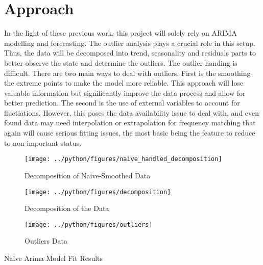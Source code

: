\documentclass[11pt, a4paper, leqno]{article}
\begin{document}
\section{Approach} %
\label{sec:appro}

In the light of these previous work, this project will solely rely on ARIMA modelling and forecasting.
The outlier analysis plays a crucial role in this setup. Thus, the data will be decomposed into trend, seasonality and residuals parts to better observe the state and determine the outliers.
The outlier handing is difficult. There are two main ways to deal with outliers. First is the smoothing the extreme points to make the model more reliable. This approach will lose valuable information but significantly improve the data process and allow for better prediction. The second is the use of external variables to account for fluctiations. However, this poses the data availability issue to deal with, and even found data may need interpolation or extrapolation for frequency matching that again will cause serious fitting issues, the most basic being the feature to reduce to non-important status.




\begin{figure}[H]

    \centering
    \texttt{[image: ../python/figures/naive\_handled\_decomposition]}

    \caption{Decomposition of Naive-Smoothed Data}
    \label{fig:daily_consumption}

\end{figure}


\begin{figure}[H]

    \centering
    \texttt{[image: ../python/figures/decomposition]}

    \caption{Decomposition of the Data}
    \label{fig:daily_consumption}

\end{figure}


\begin{figure}[H]

    \centering
    \texttt{[image: ../python/figures/outliers]}

    \caption{Outliers Data}
    \label{fig:daily_consumption}

\end{figure}



\begin{table}[!h]
    
    \caption{\label{tab:python-summary} Naive Arima Model Fit Results}
\end{table}







\printbibliography
{}



\end{document}
